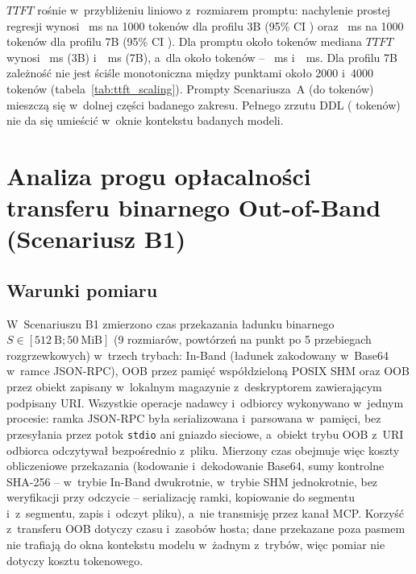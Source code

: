 $TTFT$ rośnie w~przybliżeniu liniowo z~rozmiarem promptu: nachylenie prostej regresji wynosi \wynTtftSlopeSmall~ms na 1000 tokenów dla profilu 3B (95\% CI \wynTtftSlopeCiSmall) oraz \wynTtftSlopeLarge~ms na 1000 tokenów dla profilu 7B (95\% CI \wynTtftSlopeCiLarge). Dla promptu około \wynTtftPromptLargeOne{} tokenów mediana $TTFT$ wynosi \wynTtftSmallOne~ms (3B) i~\wynTtftLargeOne~ms (7B), a~dla około \wynTtftPromptLargeMax{} tokenów -- \wynTtftSmallMax~ms i~\wynTtftLargeMax~ms. Dla profilu 7B zależność nie jest ściśle monotoniczna między punktami około 2000 i~4000 tokenów (tabela~\ref{tab:ttft_scaling}). Prompty Scenariusza~A (do \wynMaxPromptEval{} tokenów) mieszczą się w~dolnej części badanego zakresu. Pełnego zrzutu DDL (\wynFullDumpTokens{} tokenów) nie da się umieścić w~oknie kontekstu badanych modeli.


\section{Analiza progu opłacalności transferu binarnego Out-of-Band (Scenariusz B1)}
\label{sec:wyniki_scenariusz_b1}

\subsection{Warunki pomiaru}

W~Scenariuszu B1 zmierzono czas przekazania ładunku binarnego $S \in [512\ \text{B}; 50\ \text{MiB}]$ (9 rozmiarów, \wynOobReps{} powtórzeń na punkt po 5 przebiegach rozgrzewkowych) w~trzech trybach: In-Band (ładunek zakodowany w~Base64 w~ramce JSON-RPC), OOB przez pamięć współdzieloną POSIX SHM oraz OOB przez obiekt zapisany w~lokalnym magazynie z~deskryptorem zawierającym podpisany URI. Wszystkie operacje nadawcy i~odbiorcy wykonywano w~jednym procesie: ramka JSON-RPC była serializowana i~parsowana w~pamięci, bez przesyłania przez potok \texttt{stdio} ani gniazdo sieciowe, a~obiekt trybu OOB z~URI odbiorca odczytywał bezpośrednio z~pliku. Mierzony czas obejmuje więc koszty obliczeniowe przekazania (kodowanie i~dekodowanie Base64, sumy kontrolne SHA-256 -- w~trybie In-Band dwukrotnie, w~trybie SHM jednokrotnie, bez weryfikacji przy odczycie -- serializację ramki, kopiowanie do segmentu i~z~segmentu, zapis i~odczyt pliku), a~nie transmisję przez kanał MCP. Korzyść z~transferu OOB dotyczy czasu i~zasobów hosta; dane przekazane poza pasmem nie trafiają do okna kontekstu modelu w~żadnym z~trybów, więc pomiar nie dotyczy kosztu tokenowego.

